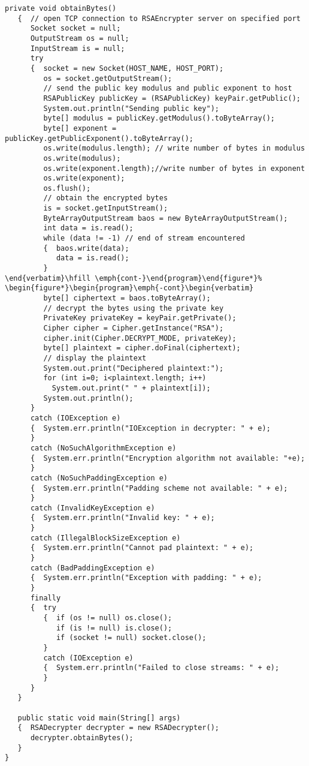 \begin{lstlisting}[caption=RSA encryption]
   private void obtainBytes()
   {  // open TCP connection to RSAEncrypter server on specified port
      Socket socket = null;
      OutputStream os = null;
      InputStream is = null;
      try
      {  socket = new Socket(HOST_NAME, HOST_PORT);
         os = socket.getOutputStream();
         // send the public key modulus and public exponent to host
         RSAPublicKey publicKey = (RSAPublicKey) keyPair.getPublic();
         System.out.println("Sending public key");
         byte[] modulus = publicKey.getModulus().toByteArray();
         byte[] exponent = publicKey.getPublicExponent().toByteArray();
         os.write(modulus.length); // write number of bytes in modulus
         os.write(modulus);
         os.write(exponent.length);//write number of bytes in exponent
         os.write(exponent);
         os.flush();
         // obtain the encrypted bytes
         is = socket.getInputStream();
         ByteArrayOutputStream baos = new ByteArrayOutputStream();
         int data = is.read();
         while (data != -1) // end of stream encountered
         {  baos.write(data);
            data = is.read();
         }
\end{verbatim}\hfill \emph{cont-}\end{program}\end{figure*}%
\begin{figure*}\begin{program}\emph{-cont}\begin{verbatim}
         byte[] ciphertext = baos.toByteArray();
         // decrypt the bytes using the private key
         PrivateKey privateKey = keyPair.getPrivate();
         Cipher cipher = Cipher.getInstance("RSA");
         cipher.init(Cipher.DECRYPT_MODE, privateKey);
         byte[] plaintext = cipher.doFinal(ciphertext);
         // display the plaintext
         System.out.print("Deciphered plaintext:");
         for (int i=0; i<plaintext.length; i++)
           System.out.print(" " + plaintext[i]);
         System.out.println();
      }
      catch (IOException e)
      {  System.err.println("IOException in decrypter: " + e);
      }
      catch (NoSuchAlgorithmException e)
      {  System.err.println("Encryption algorithm not available: "+e);
      }
      catch (NoSuchPaddingException e)
      {  System.err.println("Padding scheme not available: " + e);
      }
      catch (InvalidKeyException e)
      {  System.err.println("Invalid key: " + e);
      }
      catch (IllegalBlockSizeException e)
      {  System.err.println("Cannot pad plaintext: " + e);
      }
      catch (BadPaddingException e)
      {  System.err.println("Exception with padding: " + e);
      }
      finally
      {  try
         {  if (os != null) os.close();
            if (is != null) is.close();
            if (socket != null) socket.close();
         }
         catch (IOException e)
         {  System.err.println("Failed to close streams: " + e);
         }
      }
   }

   public static void main(String[] args)
   {  RSADecrypter decrypter = new RSADecrypter();
      decrypter.obtainBytes();
   }
}
\end{lstlisting}
